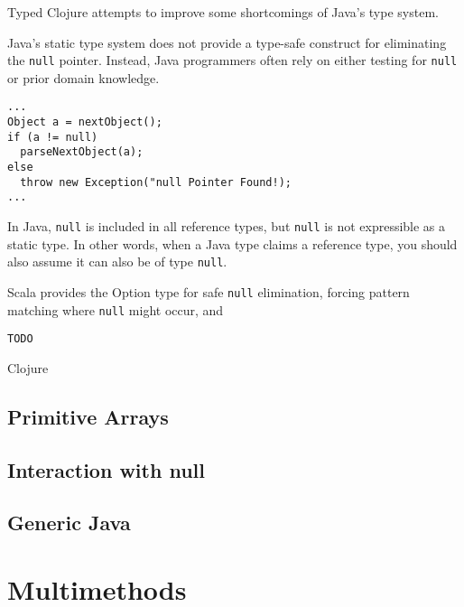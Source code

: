 Typed Clojure attempts to improve some shortcomings of Java's type system.

Java's static type system does not provide a type-safe construct for eliminating
the \lstinline|null| pointer. Instead, Java programmers often rely on either testing
for \lstinline|null| or prior domain knowledge.

\begin{lstlisting}[caption=null elimination in Java]
...
Object a = nextObject();
if (a != null)
  parseNextObject(a);
else
  throw new Exception("null Pointer Found!);
...
\end{lstlisting}



In Java, \lstinline|null| is included in all reference
types, but \lstinline|null| is not expressible as a static type. In other words,
when a Java type claims a reference type, you should also assume it can also be of 
type \lstinline|null|.

Scala provides the Option type for safe \lstinline|null| elimination, forcing pattern matching
where \lstinline|null| might occur, and 

\begin{lstlisting}[caption=null elimination in Scala]
TODO
\end{lstlisting}

Clojure 

\subsection{Primitive Arrays}

\subsection{Interaction with null}
% 

\subsection{Generic Java}

\section{Multimethods}

